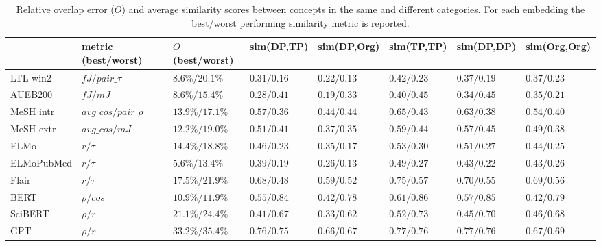 \documentclass[letterpaper]{article} %
\begin{document}
\begin{table*}[th]
    \centering
    \small
    \begin{tabular}{l l l l l l l l}
           & metric (best/worst) & $O$ (best/worst)  & sim(DP,TP) & sim(DP,Org)  &  sim(TP,TP)  & sim(DP,DP)  & sim(Org,Org) \\ 
         \midrule
LTL win2  & $fJ / pair\_\tau$ & $8.6\% / 20.1\%$  & $0.31/0.16$ & $0.22/0.13$ & $0.42/0.23$ & $0.37/0.19$ & $0.37/0.23$\\
AUEB200 & $fJ / mJ$ & $8.6\%/15.4\%$ & $0.28/0.41$ & $0.19/0.33$ & $0.40/0.45$ & $0.34/0.45$ & $0.35/0.21$\\
MeSH intr & $avg\_cos / pair\_\rho$ & $13.9\% / 17.1\%$ & $0.57/0.36$ & $0.44/0.44$ & $0.65/0.43$ & $0.63/0.38$ & $0.54/0.40$\\
MeSH extr & $avg\_cos / mJ$ & $12.2\% / 19.0\%$ & $0.51/0.41$ & $0.37/0.35$ & $0.59/0.44$ & $0.57/0.45$ & $0.49/0.38$\\
\midrule
ELMo & $r / \tau$ &$14.4\%/18.8\%$ & $0.46/0.23$ & $0.35/0.17$ & $0.53/0.30$ & $0.51/0.27$ & $0.44/0.25$\\
ELMoPubMed & $r / \tau$  &$5.6\% /13.4\% $  & $0.39/0.19$ & $0.26/0.13$ & $0.49/0.27$ & $0.43/0.22$ & $0.43/0.26$ \\
Flair & $r / \tau$ &$17.5\%/21.9\%$ & $0.68/0.48$ & $0.59/0.52$ &
$0.75/0.57$ & $0.70/0.55$ & $0.69/0.56$\\
BERT & $\rho / cos$ &$10.9\%/11.9\%$ & $0.55/0.84$ & $0.42/0.78$ & $0.61/0.86$ & $0.57/0.85$ & $0.42/0.79$ \\
SciBERT & $\rho / r$ &$21.1\% /24.4\%$& $0.41/0.67$ & $0.33/0.62$ & $0.52/0.73$ & $0.45/0.70$ & $0.46/0.68$\\
GPT & $\rho / r$ &$33.2\%/35.4\%$ & $0.76/0.75$ & $0.66/0.67$ & $0.77/0.76$ & $0.77/0.76$ & $0.67/0.69$\\
    \end{tabular}
    \caption{Relative overlap error ($O$) and average similarity scores between concepts in the same and different categories. For each embedding the best/worst performing similarity metric is reported.}
    \label{tab:categorisation_evaluation_withSimScores} 
\end{table*}
\end{document}
